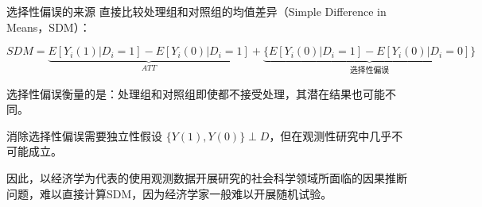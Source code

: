 \begin{frame}{选择性偏误的来源}
直接比较处理组和对照组的均值差异（Simple Difference in Means，SDM）：

\[
SDM = \underbrace{E[Y_i(1)|D_i=1] - E[Y_i(0)|D_i=1]}_{ATT} + \underbrace{\{E[Y_i(0)|D_i=1] - E[Y_i(0)|D_i=0]\}}_{\text{选择性偏误}}
\]

选择性偏误衡量的是：处理组和对照组即使都不接受处理，其潜在结果也可能不同。

消除选择性偏误需要独立性假设 $\{Y(1), Y(0)\} \perp D$，但在观测性研究中几乎不可能成立。

\vspace{0.5em}

因此，以经济学为代表的使用观测数据开展研究的社会科学领域所面临的因果推断问题，难以直接计算SDM，因为经济学家一般难以开展随机试验。
\end{frame}
